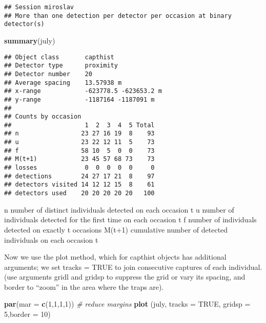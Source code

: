 \documentclass[]{article}
\newenvironment{Shaded}{\begin{snugshade}}{\end{snugshade}}
\newcommand{\CommentTok}[1]{\textcolor[rgb]{0.56,0.35,0.01}{\textit{#1}}}
\newcommand{\DataTypeTok}[1]{\textcolor[rgb]{0.13,0.29,0.53}{#1}}
\newcommand{\DecValTok}[1]{\textcolor[rgb]{0.00,0.00,0.81}{#1}}
\newcommand{\KeywordTok}[1]{\textcolor[rgb]{0.13,0.29,0.53}{\textbf{#1}}}
\newcommand{\NormalTok}[1]{#1}
\newcommand{\OtherTok}[1]{\textcolor[rgb]{0.56,0.35,0.01}{#1}}
\begin{document}
\begin{verbatim}
## Session miroslav 
## More than one detection per detector per occasion at binary detector(s)
\end{verbatim}

\begin{Shaded}
\begin{Highlighting}[]
\KeywordTok{summary}\NormalTok{(july)}
\end{Highlighting}
\end{Shaded}

\begin{verbatim}
## Object class       capthist 
## Detector type      proximity 
## Detector number    20 
## Average spacing    13.57938 m 
## x-range            -623778.5 -623653.2 m 
## y-range            -1187164 -1187091 m 
## 
## Counts by occasion 
##                    1  2  3  4  5 Total
## n                 23 27 16 19  8    93
## u                 23 22 12 11  5    73
## f                 58 10  5  0  0    73
## M(t+1)            23 45 57 68 73    73
## losses             0  0  0  0  0     0
## detections        24 27 17 21  8    97
## detectors visited 14 12 12 15  8    61
## detectors used    20 20 20 20 20   100
\end{verbatim}

n number of distinct individuals detected on each occasion t u number of
individuals detected for the first time on each occasion t f number of
individuals detected on exactly t occasions M(t+1) cumulative number of
detected individuals on each occasion t

Now we use the plot method, which for capthist objects has additional
arguments; we set tracks = TRUE to join consecutive captures of each
individual. (use arguments gridl and gridsp to suppress the grid or vary
its spacing, and border to ``zoom'' in the area where the traps are).

\begin{Shaded}
\begin{Highlighting}[]
\KeywordTok{par}\NormalTok{(}\DataTypeTok{mar =} \KeywordTok{c}\NormalTok{(}\DecValTok{1}\NormalTok{,}\DecValTok{1}\NormalTok{,}\DecValTok{1}\NormalTok{,}\DecValTok{1}\NormalTok{)) }\CommentTok{# reduce margins}
\KeywordTok{plot}\NormalTok{ (july, }\DataTypeTok{tracks =} \OtherTok{TRUE}\NormalTok{, }\DataTypeTok{gridsp =} \DecValTok{5}\NormalTok{,}\DataTypeTok{border =} \DecValTok{10}\NormalTok{)}
\end{Highlighting}
\end{Shaded}
\end{document}
